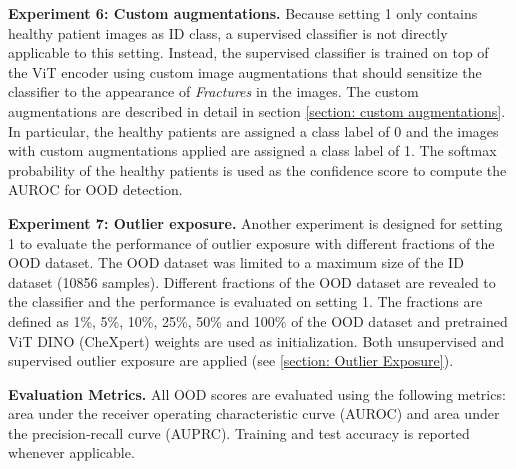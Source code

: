 \par
\textbf{Experiment 6: Custom augmentations.}
Because setting 1 only contains healthy patient images as ID class, a supervised classifier is not directly applicable to this setting.
Instead, the supervised classifier is trained on top of the ViT encoder using custom image augmentations that should sensitize the classifier to the appearance of \textit{Fractures} in the images.
The custom augmentations are described in detail in section \ref{section: custom augmentations}.
In particular, the healthy patients are assigned a class label of 0 and the images with custom augmentations applied are assigned a class label of 1.
The softmax probability of the healthy patients is used as the confidence score to compute the AUROC for OOD detection.
\par
\textbf{Experiment 7: Outlier exposure.}
Another experiment is designed for setting 1 to evaluate the performance of outlier exposure with different fractions of the OOD dataset.
The OOD dataset was limited to a maximum size of the ID dataset (10856 samples).
Different fractions of the OOD dataset are revealed to the classifier and the performance is evaluated on setting 1.
The fractions are defined as 1\%, 5\%, 10\%, 25\%, 50\% and 100\% of the OOD dataset and pretrained ViT DINO (CheXpert) weights are used as initialization.
Both unsupervised and supervised outlier exposure are applied (see \ref{section: Outlier Exposure}).
\par
\textbf{Evaluation Metrics.}
All OOD scores are evaluated using the following metrics: area under the receiver operating characteristic curve (AUROC) and area under the precision-recall curve (AUPRC).
Training and test accuracy is reported whenever applicable.
